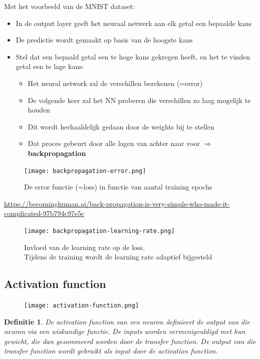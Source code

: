 \documentclass{article}
\newtheorem{theorem}{Definitie}[section]
\begin{document}
Met het voorbeeld van de MNIST dataset: 

\begin{itemize}
    \item In de output layer geeft het neuraal netwerk aan elk getal een bepaalde kans
    \item De predictie wordt gemaakt op basis van de hoogste kans
    \item Stel dat een bepaald getal een te hoge kans gekregen heeft, en het te vinden getal een te lage kans:
    \begin{itemize}
        \item Het neural network zal de verschillen berekenen (=error)
        \item De volgende keer zal het NN proberen die verschillen zo laag mogelijk te houden
        \item Dit wordt herhaaldelijk gedaan door de weights bij te stellen
        \item Dat proces gebeurt door alle lagen van achter naar voor $\Rightarrow$ \textbf{backpropagation}
    \end{itemize}
\end{itemize}

\begin{figure}[H]
    \centering
    \texttt{[image: backpropagation-error.png]}
    \caption{De error functie (=loss) in functie van aantal training epochs}
\end{figure}

\url{https://becominghuman.ai/back-propagation-is-very-simple-who-made-it-complicated-97b794c97e5c}

\begin{figure}[H]
    \centering
    \texttt{[image: backpropagation-learning-rate.png]}
    \caption{Invloed van de learning rate op de loss.\\ Tijdens de training wordt de learning rate adaptief bijgesteld}
\end{figure}

\subsection{Activation function}

\begin{figure}[H]
    \centering
    \texttt{[image: activation-function.png]}
\end{figure}


\begin{theorem}
    De activation function van een neuron definieert de output van die neuron via een wiskundige functie. 
    De inputs worden vermenigvuldigd met hun gewicht, die dan gesommeerd worden door de transfer function. 
    De output van die transfer function wordt gebruikt als input door de activation function.
\end{theorem}
\end{document}
